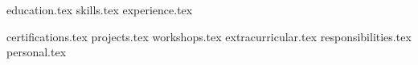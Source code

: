 \documentclass[11pt, a4paper]{awesome-cv}
\newcommand*{\sectiondir}{resume/}
\begin{document}
\makecvheader

{education.tex}
{skills.tex}
{experience.tex}
\pagebreak

{certifications.tex}
{projects.tex}
{workshops.tex}
{extracurricular.tex}
{responsibilities.tex}
{personal.tex}
\end{document}
